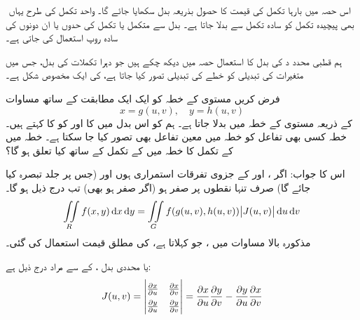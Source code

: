 ﻿
اس حصہ میں بارہا تکمل کی قیمت کا حصول بذریعہ بدل سکھایا جائے گا۔ واحد تکمل کی طرح یہاں بھی پیچیدہ تکمل کو سادہ تکمل سے بدلا  جاتا  ہے۔ بدل سے متکمل  یا تکمل کی حدوں یا ان دونوں  کی سادہ  روپ استعمال کی جاتی ہے۔




ہم قطبی محدد د کی بدل کا استعمال حصہ  میں  دیکھ چکے ہیں جو دہرا تکملات کی بدل، جس میں متغیرات کی تبدیلی کو خطے کی تبدیلی تصور کیا جاتا ہے، کی ایک  مخصوص شکل ہے۔ 


فرض کریں مستوی  کے خطہ  کو ایک ایک مطابقت کے ساتھ مساوات
\[x=g(u,v),\quad y=h(u,v)\]
 کے ذریعہ مستوی  کے خطہ  میں بدلا جاتا ہے۔ ہم  کو اس بدل میں  کا  اور  کو  کا   کہتے ہیں۔خطہ  کسی بھی تفاعل  کو خطہ  میں معین تفاعل  بھی تصور کیا جا سکتا ہے۔ خطہ  میں  کے تکمل کا خطہ  میں  کے تکمل کے ساتھ کیا تعلق ہو گا؟


اس کا جواب: اگر ،  اور  کے جزوی تفرقات استمراری ہوں اور  (جس پر جلد تبصرہ کیا جائے گا) صرف  تنہا نقطوں پر صفر ہو (اگر صفر ہو بھی)  تب درج ذیل ہو گا۔ 
\begin{align}\label{مساوات_بالکثرت_یعقوبی_بدل}
\iint\limits_{R} f(x,y)\dif x\dif y=\iint\limits_G f(g(u,v),h(u,v))\abs{J(u,v)}\dif u\dif v
\end{align}
مذکورہ بالا مساوات میں ، جو  کہلاتا ہے، کی مطلق قیمت استعمال کی گئی۔


   یا محددی بدل ،  کے  سے مراد درج ذیل ہے:
\begin{align}\label{مساوات_بالکثرت_یعقوبی_تعریف}
\renewcommand{\arraystretch}{1.5}
J(u,v)=\begin{vmatrix}
\frac{\partial x}{\partial u}&\frac{\partial x}{\partial v}\\
\frac{\partial y}{\partial u}&\frac{\partial y}{\partial v}
\end{vmatrix}=
\frac{\partial x}{\partial u}\frac{\partial y}{\partial v}-\frac{\partial y}{\partial u}\frac{\partial x}{\partial v}
\end{align}


